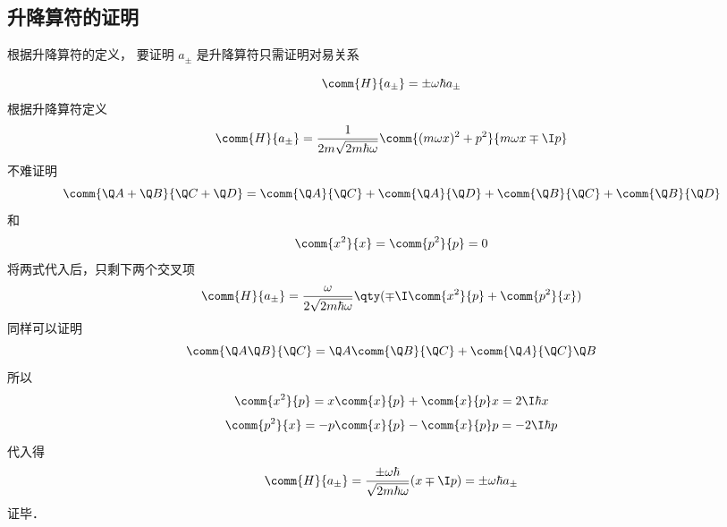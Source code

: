 \subsection{升降算符的证明}

根据升降算符的定义， 要证明 $a_\pm$ 是升降算符只需证明对易关系

\begin{equation}
\comm{H}{a_\pm} =  \pm \omega\hbar a_\pm
\end{equation}
根据升降算符定义
\begin{equation}
\comm{H}{a_\pm} = \frac{1}{2m\sqrt{2m\hbar \omega}} \comm{(m\omega x)^2 + p^2}{m\omega x \mp \I p}
\end{equation}
不难证明
\begin{equation}
\comm{\Q A + \Q B}{\Q C + \Q D} = \comm{\Q A}{\Q C} + \comm{\Q A}{\Q D} + \comm{\Q B}{\Q C} + \comm{\Q B}{\Q D}
\end{equation}
和
\begin{equation}
\comm{x^2}{x} = \comm{p^2}{p} = 0
\end{equation}
将两式代入后，只剩下两个交叉项
\begin{equation}
\comm{H}{a_\pm} = \frac{\omega}{2\sqrt{2m\hbar \omega}} \qty(\mp \I \comm{x^2}{p} + \comm{p^2}{x})
\end{equation}
同样可以证明
\begin{equation}
\comm{\Q A\Q B}{\Q C} = \Q A \comm{\Q B}{\Q C} + \comm{\Q A}{\Q C}\Q B
\end{equation}
所以
\begin{equation}
\comm{x^2}{p} = x\comm{x}{p} + \comm{x}{p} x = 2\I\hbar  x
\end{equation}
\begin{equation}
\comm{p^2}{x} =  -  p\comm{x}{p} - \comm{x}{p} p =  - 2\I\hbar  p
\end{equation}
代入得
\begin{equation}
\comm{H}{a_\pm} = \frac{\pm\omega\hbar}{\sqrt{2m\hbar\omega}} (x \mp \I p) =  \pm \omega\hbar a_ \pm
\end{equation}
证毕．
